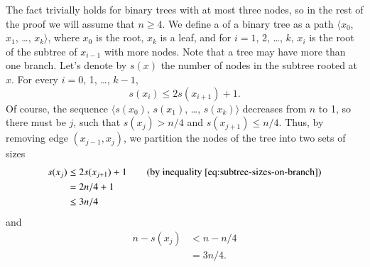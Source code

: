 \subproblem
The fact trivially holds for binary trees with at most three nodes, so in the rest of the proof we will assume that $n\ge4$.
We define a  of a binary tree as a path $\langle x_0$, $x_1$, \dots, $x_k\rangle$, where $x_0$ is the root, $x_k$ is a leaf, and for $i=1$, 2, \dots, $k$, $x_i$ is the root of the subtree of $x_{i-1}$ with more nodes.
Note that a tree may have more than one branch.
Let's denote by $s(x)$ the number of nodes in the subtree rooted at $x$.
For every $i=0$, 1, \dots, $k-1$,
\begin{equation} \label{eq:subtree-sizes-on-branch}
    s(x_i) \le 2s(x_{i+1})+1.
\end{equation}
Of course, the sequence $\langle s(x_0)$, $s(x_1)$, \dots, $s(x_k)\rangle$ decreases from $n$ to 1, so there must be $j$, such that $s(x_j)>n/4$ and $s(x_{j+1})\le n/4$.
Thus, by removing edge $(x_{j-1},x_j)$, we partition the nodes of the tree into two sets of sizes
\begin{align*}
    s(x_j) &\le 2s(x_{j+1})+1 \tag{by inequality \eqref{eq:subtree-sizes-on-branch}} \\
    &= 2n/4+1 \\
    &\le 3n/4
\end{align*}
and
\begin{align*}
    n-s(x_j) &< n-n/4 \\
    &= 3n/4.
\end{align*}
